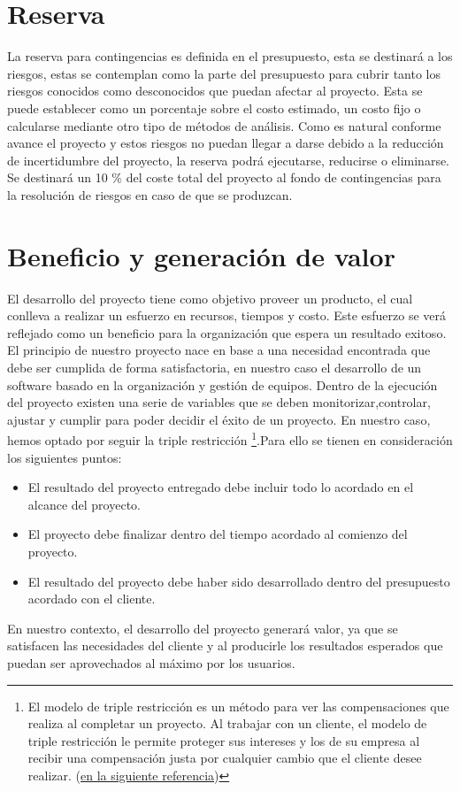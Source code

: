 \section{Reserva}

La reserva para contingencias es definida en el presupuesto, esta se destinará a los riesgos, estas se contemplan como la parte del presupuesto para cubrir tanto los riesgos conocidos como desconocidos que puedan afectar al proyecto. Esta se puede establecer como un porcentaje sobre el costo estimado, un costo fijo o calcularse mediante otro tipo de métodos de análisis. Como es natural conforme avance el proyecto y estos riesgos no puedan llegar a darse debido a la reducción de incertidumbre del proyecto, la reserva podrá ejecutarse, reducirse o eliminarse. Se destinará un 10 \% del coste total del proyecto al fondo de contingencias para la resolución de riesgos en caso de que se produzcan.


\clearpage

\section{Beneficio y generación de valor}

El desarrollo del proyecto tiene como objetivo proveer un producto, el cual conlleva a realizar un esfuerzo en recursos, tiempos y costo.
Este esfuerzo se verá reflejado como un beneficio para la organización que espera un resultado exitoso. El principio de nuestro proyecto nace en base a una necesidad encontrada que debe ser cumplida de forma satisfactoria, en nuestro caso el desarrollo de un software basado en la organización y gestión de equipos.
Dentro de la ejecución del proyecto existen una serie de variables que se deben monitorizar,controlar, ajustar y cumplir para poder decidir el éxito de un proyecto. En nuestro caso, hemos optado por seguir la triple restricción \footnote{El modelo de triple restricción es un método para ver las compensaciones que realiza al completar un proyecto. Al trabajar con un cliente, el modelo de triple restricción le permite proteger sus intereses y los de su empresa al recibir una compensación justa por cualquier cambio que el cliente desee realizar. (\href{https://buom.store/que-es-la-triple-restriccion-como-usarlo-con-ejemplos/}{en la siguiente referencia})}.Para ello se tienen en consideración los siguientes puntos:

\begin{itemize}

\item El resultado del proyecto entregado debe incluir todo lo acordado en el alcance del proyecto.

\item El proyecto debe finalizar dentro del tiempo acordado al comienzo del proyecto.

\item El resultado del proyecto debe haber sido desarrollado dentro del presupuesto acordado con el cliente.

\end{itemize}
En nuestro contexto, el desarrollo del proyecto generará valor, ya que se satisfacen las necesidades del cliente y al producirle los resultados esperados que puedan ser aprovechados al máximo por los usuarios.
